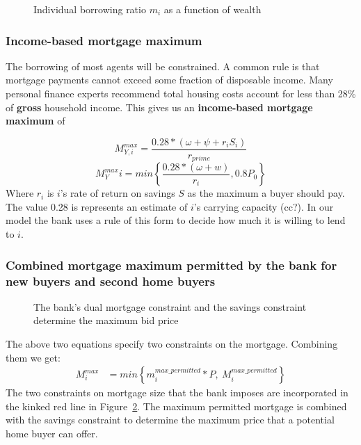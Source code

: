 {    \begin{figure}[htb]
    \begin{center}
    
    \end{center}
    \caption{Individual borrowing ratio $m_i$ as a function of wealth}
    \label{fig-borrowing-ratio}
    \end{figure}


\subsubsection{Income-based mortgage maximum}
The borrowing of most agents will be constrained. A common rule is that mortgage payments cannot exceed some fraction of disposable income. 
Many personal finance experts recommend total housing costs account for less than 28\% of \textbf{gross} household income. This gives us an \textbf{income-based  mortgage maximum} of 

\[M^{max}_{Y,i} = \frac{0.28*(\omega+ \psi + r_iS_i)}{r_{prime}}\label{eqn-income-based-mortgage}\] 
\[M^{max}_Yi = min\left\{\frac{0.28*(\omega+w)}{r_i},  0.8P_0 \right\} \]
Where $r_i$ is $i$'s rate of return on savings $S$ as the maximum a  buyer should pay.
The value 0.28 is represents an estimate of $i$'s carrying capacity ($\mathrm{cc}$?). In our model the bank uses a rule of this form to decide how much it is willing to lend to $i$.

\subsubsection{Combined mortgage maximum permitted by the bank for new buyers and second home buyers}

  \begin{figure}
    \centering
    
    \caption{The bank's dual mortgage constraint and the savings constraint determine the maximum bid price}
    \label{fig:dual-constraint}
    \end{figure}

The above  two equations specify two constraints on the mortgage.  Combining them we get:
\begin{align} 
M_i^{max} &= min \left\{ m_i^{max\_permitted}*P, \ M^{max\_permitted}_i \right\} 
\label{eqn-max-mortgage-combined}
\end{align}
The two constraints on  mortgage size that the bank imposes are incorporated in the kinked red line in Figure~\ref{fig:dual-constraint}. The maximum  permitted mortgage is combined with the savings constraint to determine the maximum price that a potential home buyer can offer.   

}
